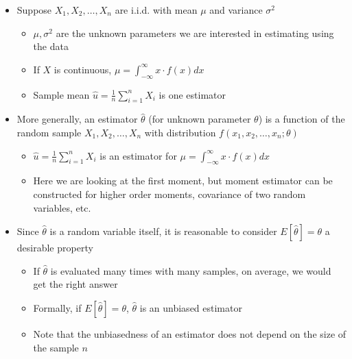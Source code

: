 \documentclass{article}
\begin{document}
\begin{itemize}
\begin{itemize}
\begin{itemize}
        \end{itemize}
        \item $X_1,X_2,\dots, X_n$ are i.i.d. for the following reasons
        \begin{itemize}
            \item Because $X_1, X_2, \dots, X_n$ are randomly drawn from the same population, the marginal distribution of $X_i$ is the same for $i=1,2,\dots,n$
            \item Under simple random sampling, knowing the value of $X_1$ provides no information about $X_2$
        \end{itemize}
    \end{itemize}
    \item Suppose $X_1, X_2, \dots, X_n$ are i.i.d. with mean $\mu$ and variance $\sigma^2$
    \begin{itemize}
        \item $\mu, \sigma^2$ are the unknown parameters we are interested in estimating using the data
        \item If $X$ is continuous, $\mu = \int_{-\infty}^\infty x \cdot f(x)dx$
        \item Sample mean $\hat{u} = \frac{1}{n} \sum_{i=1}^n X_i$ is one estimator
    \end{itemize}
    \item More generally, an estimator $\hat{\theta}$ (for unknown parameter $\theta$) is a function of the random sample $X_1, X_2, \dots, X_n$ with distribution $f(x_1, x_2, \dots, x_n; \theta)$
    \begin{itemize}
        \item $\hat{u} = \frac{1}{n} \sum_{i=1}^n X_i$ is an estimator for $\mu = \int_{-\infty}^\infty x \cdot f(x)dx$ 
        \item Here we are looking at the first moment, but moment estimator can be constructed for higher order moments, covariance of two random variables, etc.
    \end{itemize}
    \item Since $\hat{\theta}$ is a random variable itself, it is reasonable to consider $E[\hat{\theta}] =\theta$ a desirable property
    \begin{itemize}
        \item If $\hat{\theta}$ is evaluated many times with many samples, on average, we would get the right answer
        \item Formally, if $E[\hat{\theta}]=\theta$, $\hat{\theta}$ is an unbiased estimator
        \item Note that the unbiasedness of an estimator does not depend on the size of the sample $n$

\end{itemize}
\end{itemize}
\end{document}
